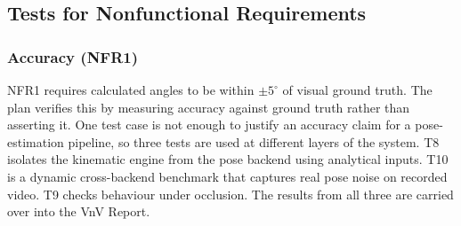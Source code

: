 \documentclass[12pt, titlepage]{article}
\begin{document}
\subsection{Tests for Nonfunctional Requirements}

\subsubsection{Accuracy (NFR1)}

NFR1 requires calculated angles to be within $\pm 5^\circ$ of visual
ground truth. The plan verifies this by measuring accuracy against
ground truth rather than asserting it. One test case is not enough to
justify an accuracy claim for a pose-estimation pipeline, so three
tests are used at different layers of the system. T8 isolates the
kinematic engine from the pose backend using analytical inputs. T10 is
a dynamic cross-backend benchmark that captures real pose noise on
recorded video. T9 checks behaviour under occlusion. The results from
all three are carried over into the VnV Report.
\end{document}
